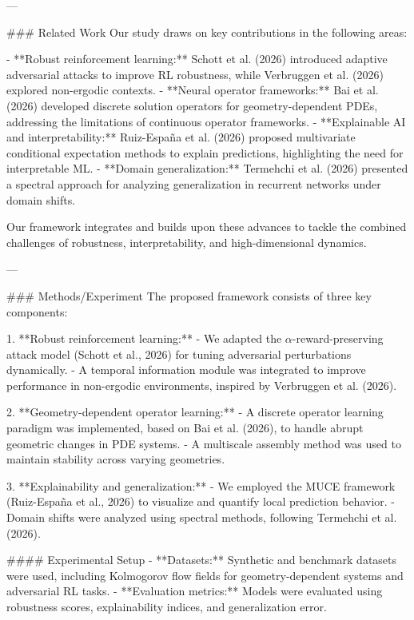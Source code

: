 ---

### Related Work  
Our study draws on key contributions in the following areas:  

- **Robust reinforcement learning:** Schott et al. (2026) introduced adaptive adversarial attacks to improve RL robustness, while Verbruggen et al. (2026) explored non-ergodic contexts.  
- **Neural operator frameworks:** Bai et al. (2026) developed discrete solution operators for geometry-dependent PDEs, addressing the limitations of continuous operator frameworks.  
- **Explainable AI and interpretability:** Ruiz-España et al. (2026) proposed multivariate conditional expectation methods to explain predictions, highlighting the need for interpretable ML.  
- **Domain generalization:** Termehchi et al. (2026) presented a spectral approach for analyzing generalization in recurrent networks under domain shifts.  

Our framework integrates and builds upon these advances to tackle the combined challenges of robustness, interpretability, and high-dimensional dynamics.  

---

### Methods/Experiment  
The proposed framework consists of three key components:  

1. **Robust reinforcement learning:**  
   - We adapted the $\alpha$-reward-preserving attack model (Schott et al., 2026) for tuning adversarial perturbations dynamically.  
   - A temporal information module was integrated to improve performance in non-ergodic environments, inspired by Verbruggen et al. (2026).  

2. **Geometry-dependent operator learning:**  
   - A discrete operator learning paradigm was implemented, based on Bai et al. (2026), to handle abrupt geometric changes in PDE systems.  
   - A multiscale assembly method was used to maintain stability across varying geometries.  

3. **Explainability and generalization:**  
   - We employed the MUCE framework (Ruiz-España et al., 2026) to visualize and quantify local prediction behavior.  
   - Domain shifts were analyzed using spectral methods, following Termehchi et al. (2026).  

#### Experimental Setup  
- **Datasets:** Synthetic and benchmark datasets were used, including Kolmogorov flow fields for geometry-dependent systems and adversarial RL tasks.  
- **Evaluation metrics:** Models were evaluated using robustness scores, explainability indices, and generalization error.  

